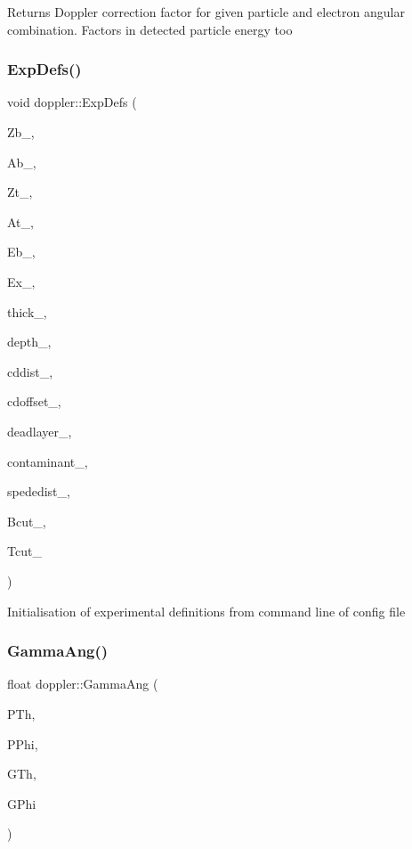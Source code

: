 Returns Doppler correction factor for given particle and electron angular combination. Factors in detected particle energy too \mbox{\label{classdoppler_ac628277148db1641251745f86ba3dc52}} 
\subsubsection{\texorpdfstring{Exp\+Defs()}{ExpDefs()}}
{\footnotesize\ttfamily void doppler\+::\+Exp\+Defs (\begin{DoxyParamCaption}\item[{int}]{Zb\+\_\+,  }\item[{float}]{Ab\+\_\+,  }\item[{int}]{Zt\+\_\+,  }\item[{float}]{At\+\_\+,  }\item[{float}]{Eb\+\_\+,  }\item[{float}]{Ex\+\_\+,  }\item[{float}]{thick\+\_\+,  }\item[{float}]{depth\+\_\+,  }\item[{float}]{cddist\+\_\+,  }\item[{float}]{cdoffset\+\_\+,  }\item[{float}]{deadlayer\+\_\+,  }\item[{float}]{contaminant\+\_\+,  }\item[{float}]{spededist\+\_\+,  }\item[{T\+CutG $\ast$}]{Bcut\+\_\+,  }\item[{T\+CutG $\ast$}]{Tcut\+\_\+ }\end{DoxyParamCaption})}

Initialisation of experimental definitions from command line of config file \mbox{\label{classdoppler_a6dca381f91f2267abefadd62cf66f69f}} 
\subsubsection{\texorpdfstring{Gamma\+Ang()}{GammaAng()}}
{\footnotesize\ttfamily float doppler\+::\+Gamma\+Ang (\begin{DoxyParamCaption}\item[{float}]{P\+Th,  }\item[{float}]{P\+Phi,  }\item[{float}]{G\+Th,  }\item[{float}]{G\+Phi }\end{DoxyParamCaption})}

